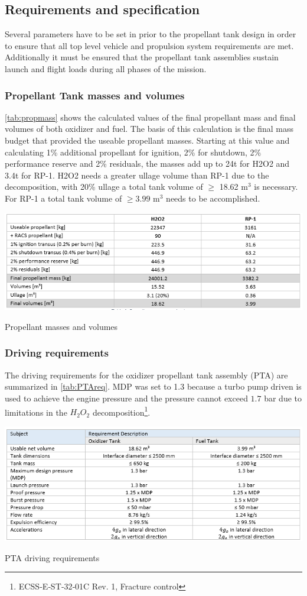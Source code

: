 \subsection{Requirements and specification}
Several parameters have to be set in prior to the propellant tank design in order to ensure that all top level vehicle and propulsion system requirements are met. Additionally it must be ensured that the propellant tank assemblies sustain launch and flight loads during all phases of the mission.
\subsubsection{Propellant Tank masses and volumes}

\autoref{tab:propmass} shows the calculated values of the final propellant mass and final volumes of both oxidizer and fuel. The basis of this calculation is the final mass budget that provided the useable propellant masses. Starting at this value and calculating 1\% additional propellant for ignition, 2\% for shutdown, 2\% performance reserve and 2\% residuals, the masses add up to 24t for H2O2 and 3.4t for RP-1. H2O2 needs a greater ullage volume than RP-1 due to the decomposition, with 20\% ullage a total tank volume of $\geq$ 18.62 m$^3$ is necessary. For RP-1 a total tank volume of  $\geq3.99$ m$^3$ needs to be accomplished.
\begin{table}[H]
    \centering
    \includegraphics[width = \linewidth]{propmassvol}
    \caption{Propellant masses and volumes}
    \label{tab:propmass}
\end{table}{}
\subsubsection{Driving requirements}
The driving requirements for the oxidizer propellant tank assembly (PTA) are summarized in \autoref{tab:PTAreq}. MDP was set to 1.3 because a turbo pump driven is used to achieve the engine pressure and the pressure cannot exceed $1.7$ bar due to limitations in the $H_2O_2$ decomposition\footnote{ECSS‐E‐ST‐32‐01C Rev. 1, Fracture control}.
\begin{table}[H]
    \centering
    \includegraphics[width = \linewidth]{ptareq}
    \caption{PTA driving requirements}
    \label{tab:PTAreq}
\end{table}{}\pagebreak
